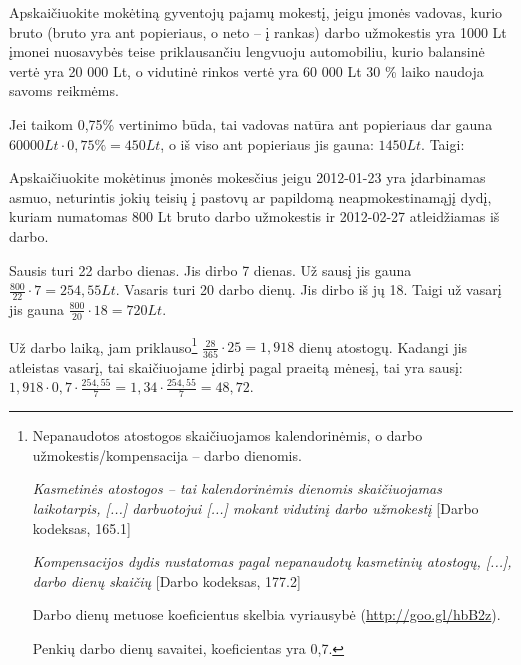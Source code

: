 \begin{tasks}
  \begin{task}
    \begin{condition}
      Apskaičiuokite mokėtiną gyventojų pajamų mokestį, jeigu
      įmonės vadovas, kurio bruto (bruto yra ant popieriaus, o
      neto – į rankas) darbo užmokestis yra 1000 Lt įmonei nuosavybės
      teise priklausančiu lengvuoju automobiliu, kurio balansinė
      vertė yra 20 000 Lt, o vidutinė rinkos vertė yra 60 000 Lt
      30 \% laiko naudoja savoms reikmėms.
    \end{condition}
    \begin{solution}
      Jei taikom 0,75\% vertinimo būda, tai vadovas natūra ant
      popieriaus dar gauna $60000Lt \cdot 0,75\% = 450 Lt$,
      o iš viso ant popieriaus jis gauna: $1450 Lt$. Taigi:

      
    \end{solution}
  \end{task}

  \begin{task}
    \begin{condition}
      Apskaičiuokite mokėtinus įmonės mokesčius jeigu 2012-01-23
      yra įdarbinamas asmuo, neturintis jokių teisių į pastovų ar
      papildomą neapmokestinamąjį dydį, kuriam numatomas 800 Lt
      bruto darbo užmokestis ir 2012-02-27 atleidžiamas iš darbo.
    \end{condition}
    \begin{solution}
      Sausis turi 22 darbo dienas. Jis dirbo 7 dienas. Už sausį jis
      gauna $\frac{800}{22} \cdot 7 = 254,55 Lt$. Vasaris turi 20 darbo
      dienų. Jis dirbo iš jų 18. Taigi už vasarį jis gauna
      $\frac{800}{20} \cdot 18 = 720 Lt$.

      Už darbo laiką, jam priklauso\footnote{%
      Nepanaudotos atostogos skaičiuojamos kalendorinėmis, o darbo
      užmokestis/kompensacija – darbo dienomis.

      \emph{Kasmetinės atostogos – tai kalendorinėmis dienomis
      skaičiuojamas laikotarpis, [...] darbuotojui [...] mokant
      vidutinį darbo užmokestį} [Darbo kodeksas, 165.1]

      \emph{Kompensacijos dydis nustatomas pagal nepanaudotų
      kasmetinių atostogų, [...], darbo dienų skaičių
      } [Darbo kodeksas, 177.2]

      Darbo dienų metuose koeficientus skelbia vyriausybė
      (\url{http://goo.gl/hbB2z}).

      Penkių darbo dienų savaitei, koeficientas yra 0,7.}
      $\frac{28}{365} \cdot 25 = 1,918$
      dienų atostogų. Kadangi jis atleistas vasarį, tai skaičiuojame
      įdirbį pagal praeitą mėnesį, tai yra sausį:
      $1,918 \cdot 0,7 \cdot \frac{254,55}{7} %
= 1,34 \cdot \frac{254,55}{7} = 48,72$.


\end{solution}
\end{task}
\end{tasks}
